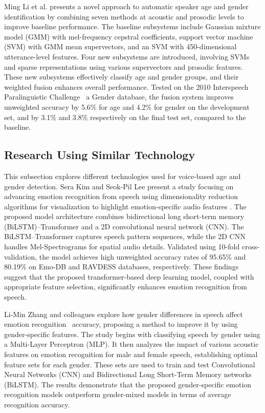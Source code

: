 \documentclass[conference, 10pt,onecolumn]{IEEEtran}
\begin{document}
Ming Li et al. \cite{li2013automatic} presents a novel approach to automatic speaker age and gender identification by combining seven methods at acoustic and prosodic levels to improve baseline performance. The baseline subsystems include Gaussian mixture model (GMM) with mel-frequency cepstral coefficients, support vector machine (SVM) with GMM mean supervectors, and an SVM with 450-dimensional utterance-level features. Four new subsystems are introduced, involving SVMs and sparse representations using various supervectors and prosodic features. These new subsystems effectively classify age and gender groups, and their weighted fusion enhances overall performance. Tested on the 2010 Interspeech Paralinguistic Challenge~\cite{velichko2022complex} a Gender database, the fusion system improves unweighted accuracy by 5.6\% for age and 4.2\% for gender on the development set, and by 3.1\% and 3.8\% respectively on the final test set, compared to the baseline.

\subsection{Research Using Similar Technology}
This subsection explores different technologies used for voice-based age and gender detection. Sera Kim and Seok-Pil Lee present a study focusing on advancing emotion recognition from speech using dimensionality reduction algorithms for visualization to highlight emotion-specific audio features \cite{kim2023bilstm}. The proposed model architecture combines bidirectional long short-term memory (BiLSTM)–Transformer and a 2D convolutional neural network (CNN). The BiLSTM–Transformer captures speech pattern sequences, while the 2D CNN handles Mel-Spectrograms for spatial audio details. Validated using 10-fold cross-validation, the model achieves high unweighted accuracy rates of 95.65\% and 80.19\% on Emo-DB and RAVDESS databases, respectively. These findings suggest that the proposed transformer-based deep learning model, coupled with appropriate feature selection, significantly enhances emotion recognition from speech.

Li-Min Zhang and colleagues explore how gender differences in speech affect emotion recognition~\cite{zhang2023deep} accuracy, proposing a method to improve it by using gender-specific features. The study begins with classifying speech by gender using a Multi-Layer Perceptron (MLP). It then analyzes the impact of various acoustic features on emotion recognition for male and female speech, establishing optimal feature sets for each gender. These sets are used to train and test Convolutional Neural Networks (CNN) and Bidirectional Long Short-Term Memory networks (BiLSTM). The results demonstrate that the proposed gender-specific emotion recognition models outperform gender-mixed models in terms of average recognition accuracy.
\end{document}

